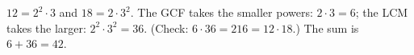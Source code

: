 $12=2^2\cdot3$ and $18=2\cdot3^2$. The GCF takes the smaller powers: $2\cdot3=6$; the LCM takes the larger: $2^2\cdot3^2=36$. (Check: $6\cdot36=216=12\cdot18$.) The sum is $6+36=\boxed{42}$.
